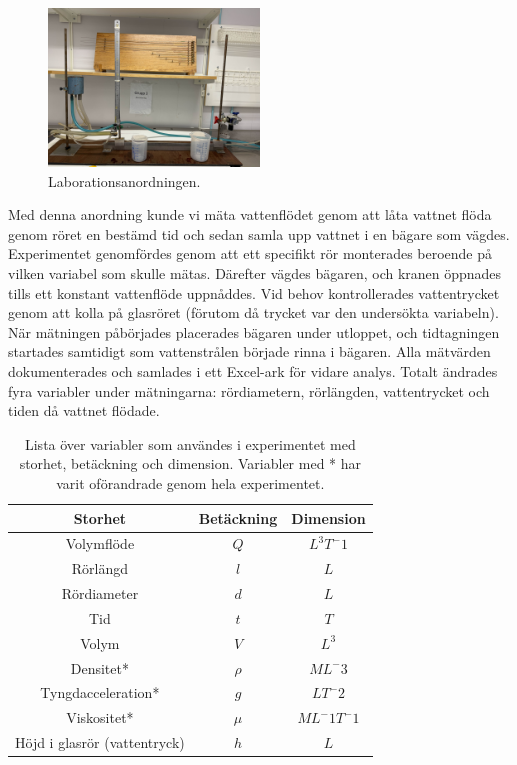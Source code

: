 \documentclass[a4paper,12pt]{article}
\begin{document}
    
    \begin{figure}[h]
        \centering
        \includegraphics[width=0.5\textwidth]{Labb-yta.jpg}
        \caption{Laborationsanordningen.}
        \label{fig:experiment_setup}
    \end{figure}
    Med denna anordning kunde vi mäta vattenflödet genom att låta vattnet flöda genom röret en bestämd tid och sedan samla upp vattnet i en bägare som vägdes.
    Experimentet genomfördes genom att ett specifikt rör monterades beroende på vilken variabel som skulle mätas. Därefter vägdes bägaren, och kranen öppnades tills ett konstant vattenflöde uppnåddes. Vid behov kontrollerades vattentrycket genom att kolla på glasröret (förutom då trycket var den undersökta variabeln).
    När mätningen påbörjades placerades bägaren under utloppet, och tidtagningen startades samtidigt som vattenstrålen började rinna i bägaren. Alla mätvärden dokumenterades och samlades i ett Excel-ark för vidare analys. Totalt ändrades fyra variabler under mätningarna: rördiametern, rörlängden, vattentrycket och tiden då vattnet flödade.
\clearpage
\begin{table}[h!]
    \centering
    \begin{tabular}{|c|c|c|}
        \hline
            \textbf{Storhet} & \textbf{Betäckning} & \textbf{Dimension}\\ \hline
            Volymflöde & $Q$ & $L^3T^-1$\\ \hline
            Rörlängd & $l$ & $L$\\ \hline
            Rördiameter & $d$ & $L$\\ \hline
            Tid & $t$ & $T$\\ \hline
            Volym & $V$ & $L^3$\\ \hline
            Densitet* & $\rho$ & $ML^-3$\\ \hline
            Tyngdacceleration* & $g$ & $LT^-2$\\ \hline
            Viskositet* & $\mu$ & $ML^-1T^-1$\\ \hline
            Höjd i glasrör (vattentryck) & $h$ & $L$\\ \hline
    \end{tabular}
    \caption{Lista över variabler som användes i experimentet med storhet, betäckning och dimension. Variabler med * har varit oförandrade genom hela experimentet.}
    \label{tab:Variabellista}
\end{table}
\end{document}
